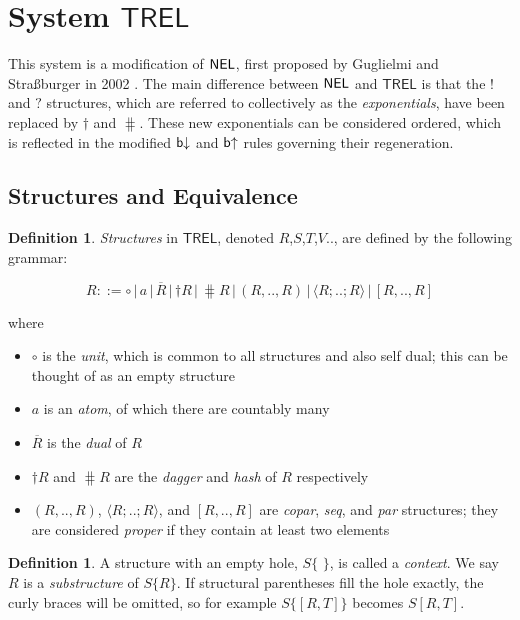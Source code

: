 \documentclass[11pt, oneside]{article}
\theoremstyle{plain}
\theoremstyle{definition}
\newtheorem{definition}[theorem]{Definition}
\let\originaldagger\dagger
\renewcommand{\dag}{\mathord{\originaldagger}}
\newcommand{\la}{\langle}
\newcommand{\ra}{\rangle}
\newcommand{\sSys}{{\mathsf{TREL}}}%
\newcommand{\unit}{\circ}
\begin{document}
\newpage
\section{System $\sSys$}

This system is a modification of ${\mathsf{NEL}}$, first proposed by Guglielmi and Straßburger in 2002 \cite{guglielmi2002non}.
The main difference between ${\mathsf{NEL}}$ and $\sSys$ is that the $!$ and $?$ structures, which are referred to collectively as the \textit{exponentials}, have been replaced by $\dag$ and $\hash$.
These new exponentials can be considered ordered, which is reflected in the modified ${\mathsf b}{\downarrow}$ and ${\mathsf b}{ \uparrow}$ rules governing their regeneration.

\subsection{Structures and Equivalence}

\begin{definition}
\textit{Structures} in $\sSys$, denoted $R$,$S$,$T$,$V$.., are defined by the following grammar:

\[R ::= \unit \,|\, a \,|\, \overline{R} \,|\, \dag R \,|\, \hash R \,|\, (R,..,R) \,|\, \la R;..;R\ra \,|\, [R,..,R]\]

where
\begin{itemize}
\item $\unit$ is the \textit{unit}, which is common to all structures and also self dual; this can be thought of as an empty structure
\item $a$ is an \textit{atom}, of which there are countably many
\item $\overline{R}$ is the \textit{dual} of $R$
\item $\dag R$ and $\hash R$ are the \textit{dagger} and \textit{hash} of $R$ respectively
\item $(R,..,R)$, $\la R;..;R\ra$, and $[R,..,R]$ are \textit{copar}, \textit{seq}, and \textit{par} structures; they are considered \textit{proper} if they contain at least two elements
\end{itemize}
\end{definition}

\begin{definition}
A structure with an empty hole, $S\{\,\,\}$, is called a \textit{context}.
We say $R$ is a \textit{substructure} of $S\{R\}$.
If structural parentheses fill the hole exactly, the curly braces will be omitted, so for example $S\{[R,T]\}$ becomes $S[R,T]$.
\end{definition}
\end{document}
